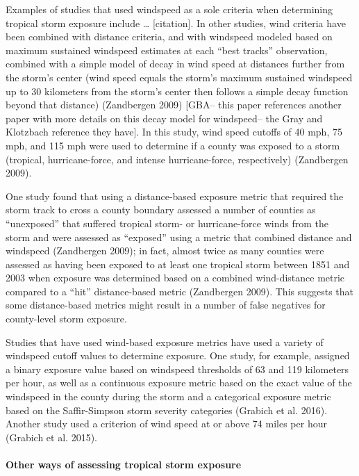 \documentclass[]{elsarticle} %
\begin{document}
Examples of studies that used windspeed as a sole criteria when
determining tropical storm exposure include \ldots{} {[}citation{]}. In
other studies, wind criteria have been combined with distance criteria,
and with windspeed modeled based on maximum sustained windspeed
estimates at each ``best tracks'' observation, combined with a simple
model of decay in wind speed at distances further from the storm's
center (wind speed equals the storm's maximum sustained windspeed up to
30 kilometers from the storm's center then follows a simple decay
function beyond that distance) (Zandbergen 2009) {[}GBA-- this paper
references another paper with more details on this decay model for
windspeed-- the Gray and Klotzbach reference they have{]}. In this
study, wind speed cutoffs of 40 mph, 75 mph, and 115 mph were used to
determine if a county was exposed to a storm (tropical, hurricane-force,
and intense hurricane-force, respectively) (Zandbergen 2009).

One study found that using a distance-based exposure metric that
required the storm track to cross a county boundary assessed a number of
counties as ``unexposed'' that suffered tropical storm- or
hurricane-force winds from the storm and were assessed as ``exposed''
using a metric that combined distance and windspeed (Zandbergen 2009);
in fact, almost twice as many counties were assessed as having been
exposed to at least one tropical storm between 1851 and 2003 when
exposure was determined based on a combined wind-distance metric
compared to a ``hit'' distance-based metric (Zandbergen 2009). This
suggests that some distance-based metrics might result in a number of
false negatives for county-level storm exposure.

Studies that have used wind-based exposure metrics have used a variety
of windspeed cutoff values to determine exposure. One study, for
example, assigned a binary exposure value based on windspeed thresholds
of 63 and 119 kilometers per hour, as well as a continuous exposure
metric based on the exact value of the windspeed in the county during
the storm and a categorical exposure metric based on the Saffir-Simpson
storm severity categories (Grabich et al. 2016). Another study used a
criterion of wind speed at or above 74 miles per hour (Grabich et al.
2015).

\paragraph{Other ways of assessing tropical storm
exposure}\label{other-ways-of-assessing-tropical-storm-exposure}
\end{document}
